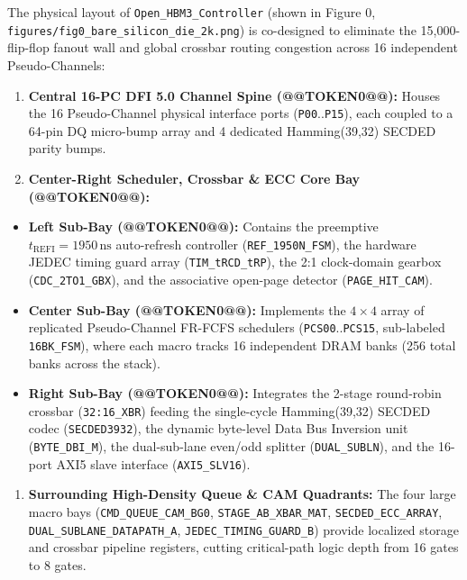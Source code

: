 \documentclass[journal,10pt,twocolumn]{IEEEtran}
\begin{document}
The physical layout of \texttt{Open\_HBM3\_Controller} (shown in Figure 0, \texttt{figures/fig0\_bare\_silicon\_die\_2k.png}) is co-designed to eliminate the 15,000-flip-flop fanout wall and global crossbar routing congestion across 16 independent Pseudo-Channels:

\begin{enumerate}
  \item \textbf{Central 16-PC DFI 5.0 Channel Spine (@@TOKEN0@@):} Houses the 16 Pseudo-Channel physical interface ports (\texttt{P00}..\texttt{P15}), each coupled to a 64-pin DQ micro-bump array and 4 dedicated Hamming(39,32) SECDED parity bumps.
  \item \textbf{Center-Right Scheduler, Crossbar \& ECC Core Bay (@@TOKEN0@@):}
\end{enumerate}
\begin{itemize}
  \item \textbf{Left Sub-Bay (@@TOKEN0@@):} Contains the preemptive $t_{\mathrm{REFI}}=1950\,\mathrm{ns}$ auto-refresh controller (\texttt{REF\_1950N\_FSM}), the hardware JEDEC timing guard array (\texttt{TIM\_tRCD\_tRP}), the 2:1 clock-domain gearbox (\texttt{CDC\_2TO1\_GBX}), and the associative open-page detector (\texttt{PAGE\_HIT\_CAM}).
  \item \textbf{Center Sub-Bay (@@TOKEN0@@):} Implements the $4 \times 4$ array of replicated Pseudo-Channel FR-FCFS schedulers (\texttt{PCS00}..\texttt{PCS15}, sub-labeled \texttt{16BK\_FSM}), where each macro tracks 16 independent DRAM banks (256 total banks across the stack).
  \item \textbf{Right Sub-Bay (@@TOKEN0@@):} Integrates the 2-stage round-robin crossbar (\texttt{32:16\_XBR}) feeding the single-cycle Hamming(39,32) SECDED codec (\texttt{SECDED3932}), the dynamic byte-level Data Bus Inversion unit (\texttt{BYTE\_DBI\_M}), the dual-sub-lane even/odd splitter (\texttt{DUAL\_SUBLN}), and the 16-port AXI5 slave interface (\texttt{AXI5\_SLV16}).
\end{itemize}
\begin{enumerate}
  \item \textbf{Surrounding High-Density Queue \& CAM Quadrants:} The four large macro bays (\texttt{CMD\_QUEUE\_CAM\_BG0}, \texttt{STAGE\_AB\_XBAR\_MAT}, \texttt{SECDED\_ECC\_ARRAY}, \texttt{DUAL\_SUBLANE\_DATAPATH\_A}, \texttt{JEDEC\_TIMING\_GUARD\_B}) provide localized storage and crossbar pipeline registers, cutting critical-path logic depth from 16 gates to 8 gates.
\end{enumerate}
\end{document}
